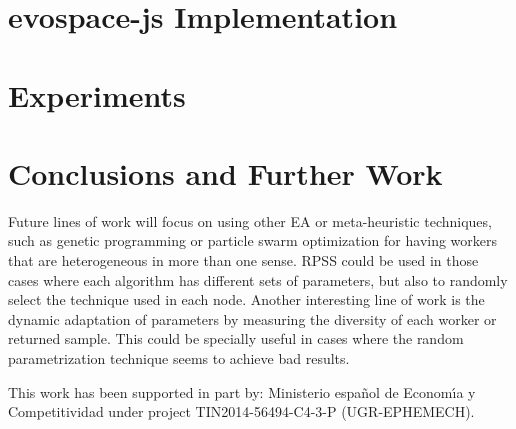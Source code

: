 \section{evospace-js Implementation}
\label{sec:evo}

\section{Experiments}
 \label{sec:experiments}


\section{Conclusions and Further Work}
\label{sec:conclusions}


Future lines of work will focus on using other EA or meta-heuristic techniques, 
such as genetic programming or particle swarm optimization for having 
workers that are heterogeneous in more than one sense. RPSS could be
used in those cases where each algorithm has different sets of
parameters, but also to randomly select the technique used in each
node. Another interesting line of work is the dynamic adaptation of
parameters by measuring the diversity of each worker or returned
sample. This could be specially useful in cases where the random
parametrization technique seems to achieve bad results. 

\begin{acks}
This work has been supported in part by:  Ministerio espa\~{n}ol de
Econom\'{\i}a y Competitividad under project TIN2014-56494-C4-3-P
(UGR-EPHEMECH).
\end{acks}
